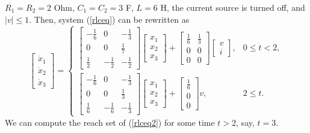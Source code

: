 $R_1=R_2=2$ Ohm, $C_1=C_2=3$ F, $L=6$ H, the current source is turned off,
and $|v|\leq 1$. Then, system (\ref{rlceq}) can be rewritten as
\begin{equation}
\left[\begin{array}{c}
\dot{x}_1\\
\dot{x}_2\\
\dot{x}_3\end{array}\right] = \left\{\begin{array}{ll}
\left[\begin{array}{ccc}
-\frac{1}{6} & 0 & -\frac{1}{3}\\
0 & 0 & \frac{1}{7}\\
\frac{1}{2} & -\frac{1}{2} & -\frac{1}{2}\end{array}\right]
\left[\begin{array}{c}
x_1\\
x_2\\
x_3\end{array}\right] + \left[\begin{array}{cc}
\frac{1}{6} & \frac{1}{3}\\
0 & 0\\
0 & 0\end{array}\right]\left[\begin{array}{c}
v\\
i\end{array}\right], & 0\leq t< 2, \\
\left[\begin{array}{ccc}
-\frac{1}{6} & 0 & -\frac{1}{3}\\
0 & 0 & \frac{1}{3}\\
\frac{1}{6} & -\frac{1}{6} & -\frac{1}{3}\end{array}\right]
\left[\begin{array}{c}
x_1\\
x_2\\
x_3\end{array}\right] + \left[\begin{array}{c}
\frac{1}{6} \\
0 \\
0 \end{array}\right]v, & 2\leq t. \end{array}\right.
\label{rlceq2}
\end{equation}
We can compute the reach set of (\ref{rlceq2}) for some time $t>2$, say, $t=3$.


